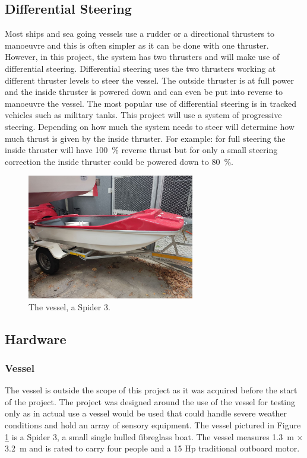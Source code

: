 	\subsection{Differential Steering} 
	Most ships and sea going vessels use a rudder or a directional thrusters to manoeuvre and this is often simpler as it can be done with one thruster. However, in this project, the system has two thrusters and will make use of differential steering. Differential steering uses the two thrusters working at different thruster levels to steer the vessel. The outside thruster is at full power and the inside thruster is powered down and can even be put into reverse to manoeuvre the vessel. The most popular use of differential steering is in tracked vehicles such as military tanks. This project will use a system of progressive steering. Depending on how much the system needs to steer will determine how much thrust is given by the inside thruster. For example: for full steering the inside thruster will have \SI{100}{\percent} reverse thrust but for only a small steering correction the inside thruster could be powered down to \SI{80}{\percent}.
\begin{figure}
	\begin{center}
		\includegraphics[width = 0.65\textwidth]{figures/spider3.jpg}
		\caption{The vessel, a Spider 3.}
		\label{fig:3:spider}
	\end{center}
\end{figure}
	\subsection{Hardware}\par
		\subsubsection{Vessel}
		The vessel is outside the scope of this project as it was acquired before the start of the project. The project was designed around the use of the vessel for testing only as in actual use a vessel would be used that could handle severe weather conditions and hold an array of sensory equipment. The vessel pictured in Figure \ref{fig:3:spider} is a Spider 3, a small single hulled fibreglass boat. The vessel measures \SI{1.3}{\meter} $\times$ \SI{3.2}{\meter} and is rated to carry four people and a 15 Hp traditional outboard motor.\par
